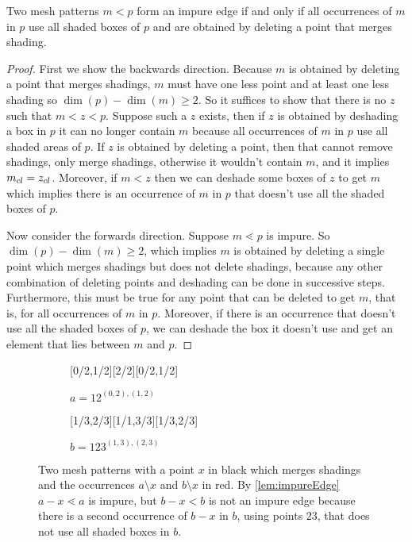 \documentclass[11pt,a4paper,oneside]{article}
\begin{document}
\begin{lem}\label{lem:impureEdge}
Two mesh patterns $m<p$ form an impure edge if and only if all occurrences of $m$ in
$p$ use all shaded boxes of $p$ and are obtained by deleting a point that merges
shading.
\begin{proof}
First we show the backwards direction. Because $m$ is obtained by deleting a
point that merges shadings, $m$ must have one less point and at least one less
shading so $\dim(p)-\dim(m)\ge2$. So it suffices to show that there is no $z$ such
that $m<z<p$. Suppose such a $z$ exists, then if $z$ is obtained by deshading a
box in $p$ it can no longer contain $m$ because all occurrences of $m$ in $p$
use all shaded areas of $p$. If $z$ is obtained by deleting a point, then that
cannot remove shadings, only merge shadings, otherwise it wouldn't contain $m$,
and it implies $m_{cl}=z_{cl}$. Moreover, if $m<z$ then we can deshade some boxes
of $z$ to get $m$ which implies there is an occurrence of $m$ in $p$ that
doesn't use all the shaded boxes of $p$.

Now consider the forwards direction. Suppose $m\lessdot p$ is impure. So
$\dim(p)-\dim(m)\ge2$, which implies $m$ is obtained by deleting a single point
which merges shadings but does not delete shadings, because any other
combination of deleting points and deshading can be done in successive steps.
Furthermore, this must be true for any point that can be deleted to get $m$,
that is, for all occurrences of $m$ in $p$. Moreover, if there is an occurrence
that doesn't use all the shaded boxes of $p$, we can deshade the box it doesn't
use and get an element that lies between $m$ and $p$.
\end{proof}
\end{lem}

\begin{figure}\centering
\begin{subfigure}[b]{0.3\textwidth}
\centering{}[0/2,1/2][2/2][0/2,1/2]
\caption*{$a=12^{(0,2),(1,2)}$}\label{subfig:a}\end{subfigure}
\begin{subfigure}[b]{0.3\textwidth}
\centering{}[1/3,2/3][1/1,3/3][1/3,2/3]
\caption*{$b=123^{(1,3),(2,3)}$}\label{subfig:b}\end{subfigure}
\caption{Two mesh patterns with a point $x$ in black which merges shadings and the occurrences
$a\setminus x$ and $b\setminus x$ in red. By \cref{lem:impureEdge} $a-x\lessdot a$ is impure,
but $b-x<b$ is not an impure edge because there is a second occurrence of $b-x$ in $b$, using points $23$,
that does not use all shaded boxes in $b$.}\label{fig:impEx}
\end{figure}
\end{document}
